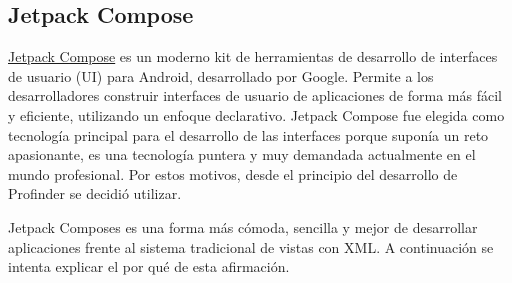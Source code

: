 \hypertarget{subsec:compose}{}
\subsection{Jetpack Compose}
\href{https://developer.android.com/develop/ui/compose}{Jetpack Compose} es un moderno kit de herramientas de desarrollo de interfaces de usuario (UI) para Android, desarrollado por Google. Permite a los desarrolladores construir interfaces de usuario de aplicaciones de forma más fácil y eficiente, utilizando un enfoque declarativo. Jetpack Compose fue elegida como tecnología principal para el desarrollo de las interfaces porque suponía un reto apasionante, es una tecnología puntera y muy demandada actualmente en el mundo profesional. Por estos motivos, desde el principio del desarrollo de Profinder se decidió utilizar. 

Jetpack Composes es una forma más cómoda, sencilla y mejor de desarrollar aplicaciones frente al sistema tradicional de vistas con XML. A continuación se intenta explicar el por qué de esta afirmación.
